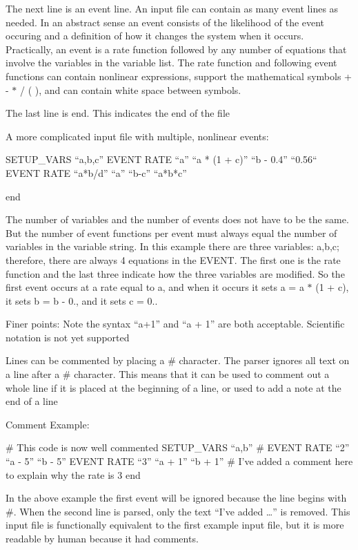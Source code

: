 The next line is an event line. An input file can contain as many event lines as needed. In an abstract sense an event consists of the likelihood of the event occuring and a definition of how it changes the system when it occurs. Practically, an event is a rate function followed by any number of equations that involve the variables in the variable list. The rate function and following event functions can contain nonlinear expressions, support the mathematical symbols + -\/ $\ast$ / ( ), and can contain white space between symbols.

The last line is end. This indicates the end of the file

A more complicated input file with multiple, nonlinear events\+: \begin{DoxyVerb}SETUP_VARS “a,b,c”
EVENT RATE “a” “a * (1 + c)” “b - 0.4” “0.56“
EVENT RATE “a*b/d” “a” “b-c” “a*b*c”

end
\end{DoxyVerb}


The number of variables and the number of events does not have to be the same. But the number of event functions per event must always equal the number of variables in the variable string. In this example there are three variables\+: a,b,c; therefore, there are always 4 equations in the E\+V\+E\+NT. The first one is the rate function and the last three indicate how the three variables are modified. So the first event occurs at a rate equal to a, and when it occurs it sets a = a $\ast$ (1 + c), it sets b = b -\/ 0., and it sets c = 0..

Finer points\+: Note the syntax “a+1” and “a + 1” are both acceptable. Scientific notation is not yet supported

Lines can be commented by placing a \# character. The parser ignores all text on a line after a \# character. This means that it can be used to comment out a whole line if it is placed at the beginning of a line, or used to add a note at the end of a line

Comment Example\+: \begin{DoxyVerb}# This code is now well commented
SETUP_VARS “a,b”
# EVENT RATE “2” “a - 5” “b - 5”
EVENT RATE “3” “a + 1” “b + 1”     #  I’ve added a comment here to explain why the rate is 3
end
\end{DoxyVerb}


In the above example the first event will be ignored because the line begins with \#. When the second line is parsed, only the text “\+I’ve added …” is removed. This input file is functionally equivalent to the first example input file, but it is more readable by human because it had comments.

